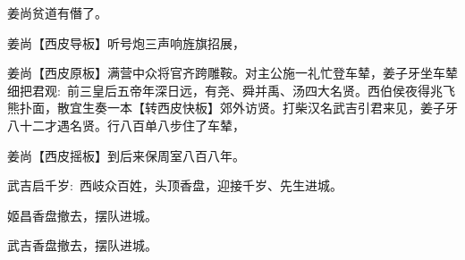 {\textrm{姜尚\hspace{30pt}贫道有僭了。}

\textrm{姜尚\hspace{30pt}【{\akai 西皮导板}】听号炮三声响旌旗招展，}

\setlength{\hangindent}{52pt}   %
{\textrm{姜尚\hspace{30pt}【{\akai 西皮原板}】满营中众将官齐跨雕鞍。对主公施一礼忙登车辇，姜子牙坐车辇细把君观:~前三皇后五帝年深日远，有尧、舜并禹、汤四大名贤。西伯侯夜得兆飞熊扑面，散宜生奏一本【{\footnotesize 转}{\akai 西皮快板}】郊外访贤。打柴汉名武吉引君来见，姜子牙八十二才遇名贤。行八百单八步住了车辇，}}

\textrm{姜尚\hspace{30pt}【{\akai 西皮摇板}】到后来保周室八百八年。}

\textrm{武吉\hspace{30pt}启千岁:~西岐众百姓，头顶香盘，迎接千岁、先生进城。}

\textrm{姬昌\hspace{30pt}香盘撤去，摆队进城。}

\textrm{武吉\hspace{30pt}香盘撤去，摆队进城。}
}

